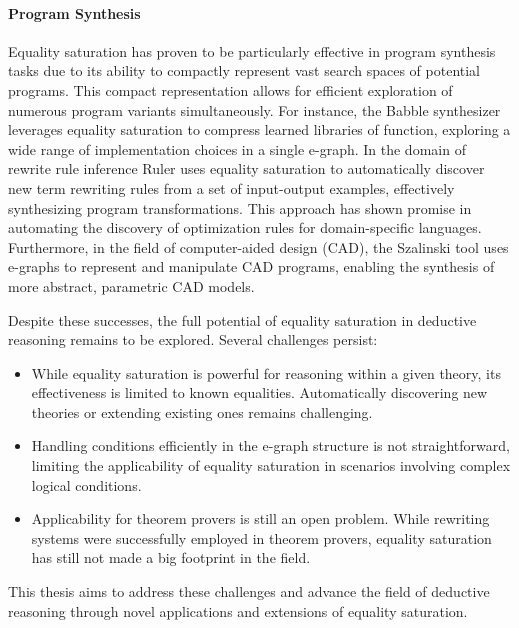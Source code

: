 \paragraph{Program Synthesis} Equality saturation has proven to be particularly effective in program synthesis tasks due to its ability to compactly represent vast search spaces of potential programs.
This compact representation allows for efficient exploration of numerous program variants simultaneously.
For instance, the Babble synthesizer \cite{cao2023babble} leverages equality saturation to compress learned libraries of function, exploring a wide range of implementation choices in a single e-graph. 
In the domain of rewrite rule inference Ruler \cite{ruler} uses equality saturation to automatically discover new term rewriting rules from a set of input-output examples, effectively synthesizing program transformations. 
This approach has shown promise in automating the discovery of optimization rules for domain-specific languages. 
Furthermore, in the field of computer-aided design (CAD), the Szalinski tool \cite{nandi2020synthesizing} uses e-graphs to represent and manipulate CAD programs, enabling the synthesis of more abstract, parametric CAD models.

\bigskip

Despite these successes, the full potential of equality saturation in deductive reasoning remains to be explored. 
Several challenges persist:

\begin{itemize}
    \item While equality saturation is powerful for reasoning within a given theory, its effectiveness is limited to known equalities. Automatically discovering new theories or extending existing ones remains challenging.
    \item Handling conditions efficiently in the e-graph structure is not straightforward, limiting the applicability of equality saturation in scenarios involving complex logical conditions.
    \item Applicability for theorem provers is still an open problem. While rewriting systems were successfully employed in theorem provers, equality saturation has still not made a big footprint in the field.
\end{itemize}

This thesis aims to address these challenges and advance the field of deductive reasoning through novel applications and extensions of equality saturation. 

